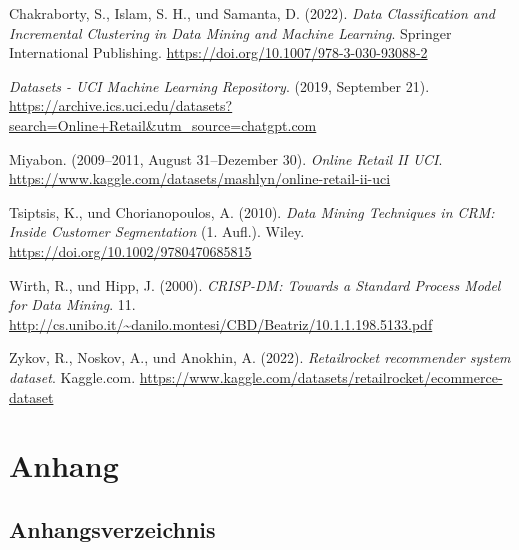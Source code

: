\documentclass[
  11pt,
  openany, oneside]{book}
\newlength{\cslhangindent}
\newenvironment{CSLReferences}[2] %
 {\begin{list}{}{%
  \setlength{\itemindent}{0pt}
  \setlength{\leftmargin}{0pt}
  \setlength{\parsep}{0pt}
  \ifodd #1
   \setlength{\leftmargin}{\cslhangindent}
   \setlength{\itemindent}{-1\cslhangindent}
  \fi
  \setlength{\itemsep}{#2\baselineskip}}}
 {\end{list}}
\begin{document}
\label{refs}
\begin{CSLReferences}{1}{0}
Chakraborty, S., Islam, S. H., und Samanta, D. (2022). \emph{Data
Classification and Incremental Clustering in Data Mining and Machine
Learning}. Springer International Publishing.
\url{https://doi.org/10.1007/978-3-030-93088-2}

\emph{Datasets - UCI Machine Learning Repository}. (2019, September 21).
\url{https://archive.ics.uci.edu/datasets?search=Online+Retail&utm_source=chatgpt.com}

Miyabon. (2009--2011, August 31--Dezember 30). \emph{Online Retail II
UCI}. \url{https://www.kaggle.com/datasets/mashlyn/online-retail-ii-uci}

Tsiptsis, K., und Chorianopoulos, A. (2010). \emph{Data Mining
Techniques in CRM: Inside Customer Segmentation} (1. Aufl.). Wiley.
\url{https://doi.org/10.1002/9780470685815}

Wirth, R., und Hipp, J. (2000). \emph{CRISP-DM: Towards a Standard
Process Model for Data Mining}. 11.
\url{http://cs.unibo.it/~danilo.montesi/CBD/Beatriz/10.1.1.198.5133.pdf}

Zykov, R., Noskov, A., und Anokhin, A. (2022). \emph{Retailrocket
recommender system dataset}. Kaggle.com.
\url{https://www.kaggle.com/datasets/retailrocket/ecommerce-dataset}

\end{CSLReferences}

\pagestyle{literature}

\clearpage

\label{sec-anhang}
\chapter*{Anhang}\label{anhang}

\thispagestyle{empty}
\renewcommand{\thefigure}{A.\arabic{figure}}
\setcounter{figure}{0}

\label{sec-anhangsverzeichnis}
\section*{Anhangsverzeichnis}\label{anhangsverzeichnis}
\end{document}
